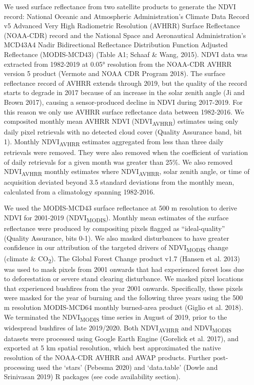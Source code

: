 \documentclass[
]{article}
\begin{document}
We used surface reflectance from two satellite products to generate the
NDVI record: National Oceanic and Atmospheric Administration's Climate
Data Record v5 Advanced Very High Radiometric Resolution (AVHRR) Surface
Reflectance (NOAA-CDR) record and the National Space and Aeronautical
Administration's MCD43A4 Nadir Bidirectional Reflectance Distribution
Function Adjusted Reflectance (MODIS-MCD43) (Table A1; Schaaf \& Wang,
2015). NDVI data was extracted from 1982-2019 at 0.05° resolution from
the NOAA-CDR AVHRR version 5 product (Vermote and NOAA CDR Program
2018). The surface reflectance record of AVHRR extends through 2019, but
the quality of the record starts to degrade in 2017 because of an
increase in the solar zenith angle (Ji and Brown 2017), causing a
sensor-produced decline in NDVI during 2017-2019. For this reason we
only use AVHRR surface reflectance data between 1982-2016. We composited
monthly mean AVHRR NDVI (NDVI\textsubscript{AVHRR}) estimates using only
daily pixel retrievals with no detected cloud cover (Quality Assurance
band, bit 1). Monthly NDVI\textsubscript{AVHRR} estimates aggregated
from less than three daily retrievals were removed. They were also
removed when the coefficient of variation of daily retrievals for a
given month was greater than 25\%. We also removed
NDVI\textsubscript{AVHRR} monthly estimates where
NDVI\textsubscript{AVHRR}, solar zenith angle, or time of acquisition
deviated beyond 3.5 standard deviations from the monthly mean,
calculated from a climatology spanning 1982-2016.

We used the MODIS-MCD43 surface reflectance at 500 m resolution to
derive NDVI for 2001-2019 (NDVI\textsubscript{MODIS}). Monthly mean
estimates of the surface reflectance were produced by compositing pixels
flagged as ``ideal-quality'' (Quality Assurance, bits 0-1). We also
masked disturbances to have greater confidence in our attribution of the
targeted drivers of NDVI\textsubscript{MODIS} change (climate \&
CO\textsubscript{2}). The Global Forest Change product v1.7 (Hansen et
al. 2013) was used to mask pixels from 2001 onwards that had experienced
forest loss due to deforestation or severe stand clearing disturbance.
We masked pixel locations that experienced bushfires from the year 2001
onwards. Specifically, these pixels were masked for the year of burning
and the following three years using the 500 m resolution MODIS-MCD64
monthly burned-area product (Giglio et al. 2018). We terminated the
NDVI\textsubscript{MODIS} time series in August of 2019, prior to the
widespread bushfires of late 2019/2020. Both NDVI\textsubscript{AVHRR}
and NDVI\textsubscript{MODIS} datasets were processed using Google Earth
Engine (Gorelick et al. 2017), and exported at 5 km spatial resolution,
which best approximated the native resolution of the NOAA-CDR AVHRR and
AWAP products. Further post-processing used the `stars' (Pebesma 2020)
and `data.table' (Dowle and Srinivasan 2019) R packages (see code
availability section).
\end{document}
